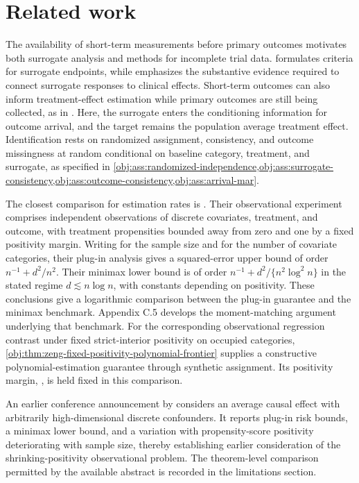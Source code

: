 \section{Related work}

The availability of short-term measurements before primary outcomes motivates both surrogate analysis and methods for incomplete trial data. \citet{Prentice1989} formulates criteria for surrogate endpoints, while \citet{Fleming1996} emphasizes the substantive evidence required to connect surrogate responses to clinical effects. Short-term outcomes can also inform treatment-effect estimation while primary outcomes are still being collected, as in \citet{VanLancker2020}. Here, the surrogate enters the conditioning information for outcome arrival, and the target remains the population average treatment effect. Identification rests on randomized assignment, consistency, and outcome missingness at random conditional on baseline category, treatment, and surrogate, as specified in \cref{obj:ass:randomized-independence,obj:ass:surrogate-consistency,obj:ass:outcome-consistency,obj:ass:arrival-mar}.

The closest comparison for estimation rates is \citet[Assumption 2, Theorems 1--2, Section 3.2, and Appendix C.5]{ZengBalakrishnanHanKennedy2026}. Their observational experiment comprises independent observations of discrete covariates, treatment, and outcome, with treatment propensities bounded away from zero and one by a fixed positivity margin. Writing  for the sample size and  for the number of covariate categories, their plug-in analysis gives a squared-error upper bound of order \(n^{-1}+d^2/n^2\). Their minimax lower bound is of order \(n^{-1}+d^2/\{n^2\log^2 n\}\) in the stated regime \(d\lesssim n\log n\), with constants depending on positivity. These conclusions give a logarithmic comparison between the plug-in guarantee and the minimax benchmark. Appendix C.5 develops the moment-matching argument underlying that benchmark. For the corresponding observational regression contrast under fixed strict-interior positivity on occupied categories, \cref{obj:thm:zeng-fixed-positivity-polynomial-frontier} supplies a constructive polynomial-estimation guarantee through synthetic assignment. Its positivity margin, , is held fixed in this comparison.

An earlier conference announcement by \citet[abstract 300411]{Kennedy2019DiscreteAbstract} considers an average causal effect with arbitrarily high-dimensional discrete confounders. It reports plug-in risk bounds, a minimax lower bound, and a variation with propensity-score positivity deteriorating with sample size, thereby establishing earlier consideration of the shrinking-positivity observational problem. The theorem-level comparison permitted by the available abstract is recorded in the limitations section.

